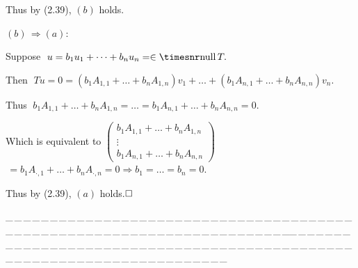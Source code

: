 \documentclass[a4paper, 11pt, UTF8]{article}
\def\null{{\timesnr\textup{null}}\,}
\def\Hb{\quad\hspace{8.7pt}}
\def\ProblemEnding{{\tiny \_\,\_\,\_\,\_\,\_\,\_\,\_\,\_\,\_\,\_\,\_\,\_\,\_\,\_\,\_\,\_\,\_\,\_\,\_\,\_\,\_\,\_\,\_\,\_\,\_\,\_\,\_\,\_\,\_\,\_\,\_\,\_\,\_\,\_\,\_\,\_\,\_\,\_\,\_\,\_\,\_\,\_\,\_\,\_\,\_\,\_\,\_\,\_\,\_\,\_\,\_\,\_\,\_\,\_\,\_\,\_\,\_\,\_\,\_\,\_\,\_\,\_\,\_\,\_\,\_\,\_\,\_\,\_\,\_\,\_\,\_\_\,\_\,\_\,\_\,\_\,\_\,\_\,\_\,\_\,\_\,\_\,\_\,\_\,\_\,\_\,\_\,\_\,\_\,\_\,\_\,\_\,\_\,\_\,\_\,\_\,\_\,\_\,\_\,\_\,\_\,\_\,\_\,\_\,\_\,\_\,\_\,\_\,\_\,\_\,\_\,\_\,\_\,\_\,\_\,\_\,\_\,\_\,\_\,\_\,\_\,\_\,\_\,\_\,\_\,\_\,\_\,\_\,\_\,\_\,\_\,\_\,\_\,\_\,\_\,\_\,\_\,\_\,\_\,\_\,\_\,\_}}
\begin{document}
\begin{large}
Thus by (2.39), $(b)$ holds.\vspace{10pt}\par\quad
$(b)\,\Rightarrow(a):\;$\par\quad\Hb
Suppose $\;u=b_1u_1+\dots+b_nu_n=\in\null T.$\par\quad\Hb
Then $\;Tu=0=(b_1A_{1,1}+\dots+b_nA_{1,n})v_1+\dots+(b_1A_{n,1}+\dots+b_nA_{n,n})v_n.$\par\quad\Hb
Thus $\;b_1A_{1,1}+\dots+b_nA_{1,n}=\dots=b_1A_{n,1}+\dots+b_nA_{n,n}=0.$\vspace{6pt}\par\quad\Hb
Which is equivalent to {\;\normalsize$
	\begin{pmatrix}
		b_1 A_{1,1}+\dots+b_nA_{1,n}\\
		\vdots\\
		b_1 A_{n,1}+\dots+b_nA_{n,n}
	\end{pmatrix}$}$\,=b_1A_{\cdot,1}+\dots+b_nA_{\cdot,n}=0\Rightarrow b_1=\dots=b_n=0.$\vspace{6pt}\par\quad\Hb
Thus by (2.39), $(a)$ holds.$\hfill\square$\par
\ProblemEnding\par
\pagebreak


\end{large}
\end{document}
